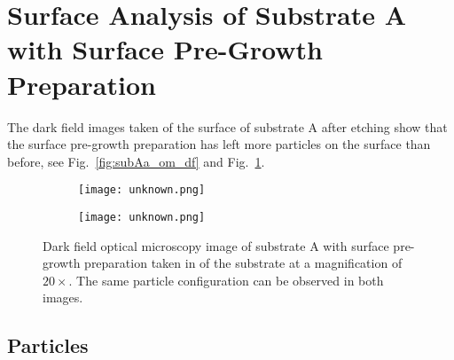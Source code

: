 \clearpage
%
%
\section[Surface Analysis of Substrate A with Surface Pre-Growth Preparation]{Surface Analysis of Substrate A with Surface Pre-Growth Preparation%
    }\label{sec:subAb}

The dark field images taken of the surface of substrate A after etching show that the surface pre-growth preparation has left more particles on the surface than before, see Fig.~\ref{fig:subAa_om_df} and Fig.~\ref{fig:subAb_om_df}.

\begin{figure}[htbp]
    \begin{subfigure}[t]{0.48\textwidth}
        \texttt{[image: unknown.png]}
        \caption{}
    \end{subfigure}%
    \hfill
    \begin{subfigure}[t]{0.48\textwidth}
        \texttt{[image: unknown.png]}
        \caption{}
    \end{subfigure}%
    \caption[Dark field optical microscopy image of substrate A with surface pre-growth preparation.]{Dark field optical microscopy image of substrate A with surface pre-growth preparation taken in  of the substrate at a magnification of $20\times$. The same particle configuration can be observed in both images.}\label{fig:subAb_om_df}
\end{figure}



\subsection{Particles}

